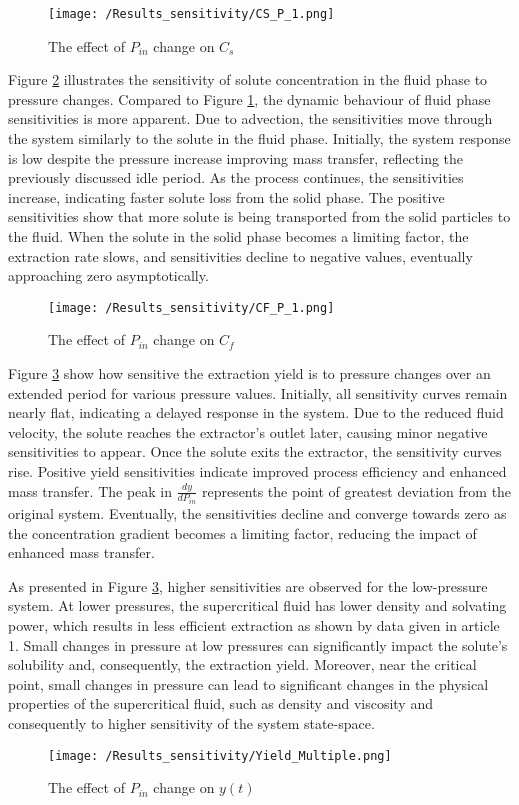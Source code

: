 \documentclass[../Article_Sensitivity_Analsysis.tex]{subfiles}
\begin{document}
	\begin{figure}[!ht]
		\centering
		\texttt{[image: /Results\_sensitivity/CS\_P\_1.png]}
		\caption{The effect of $P_{in}$ change on $C_s$}
		\label{fig:Sensitivty_P_CS}
	\end{figure}

	Figure \ref{fig:Sensitivty_P_CF} illustrates the sensitivity of solute concentration in the fluid phase to pressure changes. Compared to Figure \ref{fig:Sensitivty_P_CS}, the dynamic behaviour of fluid phase sensitivities is more apparent. Due to advection, the sensitivities move through the system similarly to the solute in the fluid phase.	Initially, the system response is low despite the pressure increase improving mass transfer, reflecting the previously discussed idle period. As the process continues, the sensitivities increase, indicating faster solute loss from the solid phase. The positive sensitivities show that more solute is being transported from the solid particles to the fluid. When the solute in the solid phase becomes a limiting factor, the extraction rate slows, and sensitivities decline to negative values, eventually approaching zero asymptotically.
	
	\begin{figure}[!ht]
		\centering
		\texttt{[image: /Results\_sensitivity/CF\_P\_1.png]}
		\caption{The effect of $P_{in}$ change on $C_f$}
		\label{fig:Sensitivty_P_CF}
	\end{figure}
	
	Figure \ref{fig:Sensitivty_P_y} show how sensitive the extraction yield is to pressure changes over an extended period for various pressure values. Initially, all sensitivity curves remain nearly flat, indicating a delayed response in the system. Due to the reduced fluid velocity, the solute reaches the extractor's outlet later, causing minor negative sensitivities to appear. Once the solute exits the extractor, the sensitivity curves rise. Positive yield sensitivities indicate improved process efficiency and enhanced mass transfer. The peak in $\frac{dy}{dP_{in}}$ represents the point of greatest deviation from the original system. Eventually, the sensitivities decline and converge towards zero as the concentration gradient becomes a limiting factor, reducing the impact of enhanced mass transfer.
	
	As presented in Figure \ref{fig:Sensitivty_P_y}, higher sensitivities are observed for the low-pressure system. At lower pressures, the supercritical fluid has lower density and solvating power, which results in less efficient extraction as shown by data given in {\color{red}article 1}. Small changes in pressure at low pressures can significantly impact the solute's solubility and, consequently, the extraction yield. Moreover, near the critical point, small changes in pressure can lead to significant changes in the physical properties of the supercritical fluid, such as density and viscosity and consequently to higher sensitivity of the system state-space.
	
	\begin{figure}[!ht]
		\centering
		\texttt{[image: /Results\_sensitivity/Yield\_Multiple.png]}
		\caption{The effect of $P_{in}$ change on $y(t)$}
		\label{fig:Sensitivty_P_y}
	\end{figure}
		
\end{document}
